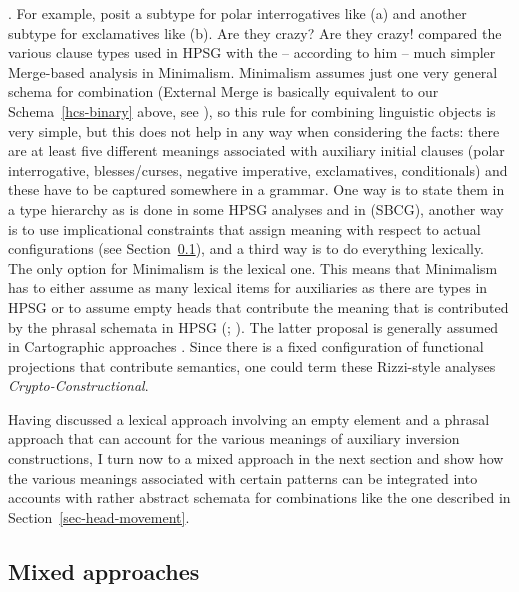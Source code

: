 \documentclass[output=paper
	        ,collection
	        ,collectionchapter
 	        ,biblatex
                ,babelshorthands
                ,newtxmath
                ,draftmode
                ,colorlinks, citecolor=brown
]{langscibook}
\begin{document}
. For example, \citet[]{Sag2020a} posit a subtype  for polar
interrogatives like (a) and another subtype  for exclamatives like (b).
\eal
\ex Are they crazy?
\ex Are they crazy!
\zl
\citet{Chomsky2010a} compared the various clause types used in HPSG with the -- according to him --
much simpler Merge-based analysis in Minimalism. Minimalism assumes just one very general schema for
combination (External Merge is basically equivalent to our Schema~\ref{hcs-binary} above, see
), so this rule for combining linguistic objects is very simple, but this
does not help in any way when considering the facts: there are at least five different meanings
associated with auxiliary initial clauses (polar interrogative, blesses/curses, negative imperative,
exclamatives, conditionals) and these have to be captured somewhere in a grammar. One
way is to state them in a type hierarchy as is done in some HPSG analyses and in \sbcg (SBCG), another way
is to use implicational constraints that assign meaning with respect to actual configurations
(see Section~\ref{sec-mixed-approaches}), and a third way is to do everything lexically. The only option for
Minimalism is the lexical one. This means that Minimalism has to either assume as many lexical items
for auxiliaries as there are types in HPSG or to assume empty heads that contribute the meaning that
is contributed by the phrasal schemata in HPSG (\citealp[Section~5]{Borsley2006a}; ). 
The latter proposal is generally assumed in
Cartographic approaches \citep{Rizzi97a-u}. Since there is a fixed configuration of functional projections
that contribute semantics, one could term these Rizzi-style analyses \emph{Crypto-Constructional}.

Having discussed a lexical approach involving an empty element and a phrasal approach that can
account for the various meanings of auxiliary inversion constructions, I turn now to a mixed
approach in the next section and show how the various meanings associated with certain patterns can
be integrated into accounts with rather abstract schemata for combinations like the one described in
Section~\ref{sec-head-movement}.

\subsection{Mixed approaches}
\label{sec-mixed-approaches}
\end{document}
